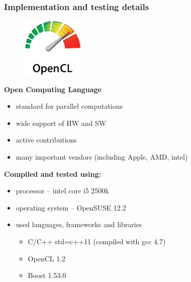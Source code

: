 \documentclass[10pt, xcolor=pdflatex, dvipsnames, table]{beamer}
\begin{document}
\begin{frame}
\frametitle{Implementation and testing details}
\begin{figure}
\includegraphics[width=3cm]{img/OpenCL_Logo.png}
\end{figure}
\textbf{Open Computing Language} 
\begin{itemize}
\item standard for parallel computations
\item wide support of HW and SW
\item active contributions 
\item many important vendors (including Apple, AMD, intel)
\end{itemize} 

\vspace{1em}

\textbf{Compiled and tested using:}
\begin{itemize}
\item processor -- intel core i5 2500k
\item operating system -- OpenSUSE 12.2
\item used languages, frameworks and libraries 
  \begin{itemize}
  \item C/C++ std=c++11 (compiled with gcc 4.7)
  \item OpenCL 1.2
  \item Boost 1.53.0
  \end{itemize}
\end{itemize}
\end{frame}
\end{document}
